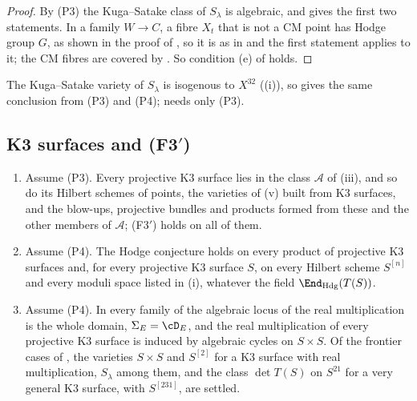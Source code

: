 \begin{proof}
By \textup{(P3)} the Kuga--Satake class of $S_{\lambda}$ is algebraic, and
 gives the first two statements. In a family
$W\to C$, a fibre $X_{t}$ that is not a CM point has Hodge group $G$, as
shown in the proof of , so it is as in
 and the first statement applies to it; the CM fibres
are covered by . So condition (e) of
 holds.
\end{proof}

The Kuga--Satake variety of $S_{\lambda}$ is isogenous to $X^{32}$
((i)), so  gives the same conclusion
from (P3) and (P4);  needs only (P3).

\subsection{K3 surfaces and \textup{(F3$'$)}}\label{ssec:k3all}

\begin{corollary}[K3 surfaces]\label{cor:k3all}
\leavevmode
\begin{enumerate}[label=\textup{(\roman*)},leftmargin=2.6em,itemsep=2pt]
\item Assume \textup{(P3)}. Every projective K3 surface lies in the class
  $\mathcal{A}$ of (iii), and so do its Hilbert schemes of
  points, the varieties of (v) built from K3 surfaces, and
  the blow-ups, projective bundles and products formed from these and the
  other members of $\mathcal{A}$; \textup{(F3$'$)} holds on all of them.
\item Assume \textup{(P4)}. The Hodge conjecture holds on every product of
  projective K3 surfaces and, for every projective K3 surface $S$, on every
  Hilbert scheme $S^{[n]}$ and every moduli space listed in
  (i), whatever the field $\End_{\mathrm{Hdg}}(T(S))$.
\item Assume \textup{(P4)}. In every family of  the algebraic
  locus of the real multiplication is the whole domain,
  $\Sigma_{E}=\cD_{E}$, and the real multiplication of every projective K3
  surface is induced by algebraic cycles on $S\times S$. Of the frontier cases
  of , the varieties $S\times S$ and $S^{[2]}$ for a
  K3 surface with real multiplication, $S_{\lambda}$ among them, and the class
  $\det T(S)$ on $S^{21}$ for a very general K3 surface, with $S^{[231]}$, are
  settled.
\end{enumerate}
\end{corollary}


